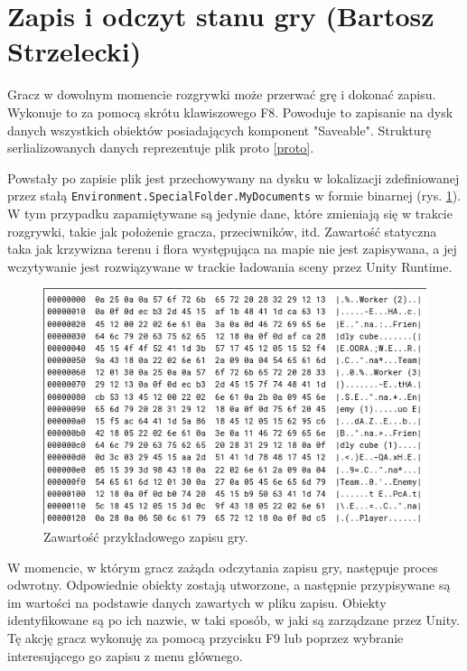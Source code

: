 \section{Zapis i odczyt stanu gry (Bartosz Strzelecki)}

Gracz w dowolnym momencie rozgrywki może przerwać grę i dokonać zapisu. Wykonuje to
za pomocą skrótu klawiszowego F8. Powoduje to zapisanie na dysk danych wszystkich obiektów posiadających
komponent "Saveable". Strukturę serlializowanych danych reprezentuje plik proto \ref{proto}.


Powstały po zapisie plik jest przechowywany na dysku w lokalizacji zdefiniowanej przez stałą \verb|Environment.SpecialFolder.MyDocuments| w formie binarnej (rys. \ref{save}).
W tym przypadku zapamiętywane są jedynie dane, które zmieniają się w trakcie rozgrywki, takie jak położenie gracza, przeciwników, itd. 
Zawartość statyczna taka jak krzywizna terenu i flora występująca na mapie nie jest zapisywana, a jej wczytywanie jest rozwiązywane
w trackie ładowania sceny przez Unity Runtime.

\begin{figure}[h]
\centering
\includegraphics[width=1\textwidth]{images/save}
\caption{Zawartość przykładowego zapisu gry.}
\label{save}
\end{figure}

W momencie, w którym gracz zażąda odczytania zapisu gry, następuje proces odwrotny. Odpowiednie obiekty zostają utworzone,
a następnie przypisywane są im wartości na podstawie danych zawartych w pliku zapisu. Obiekty identyfikowane
są po ich nazwie, w taki sposób, w jaki są zarządzane przez Unity.
Tę akcję gracz wykonuję za pomocą przycisku F9 lub poprzez wybranie interesującego go zapisu z menu głównego.

